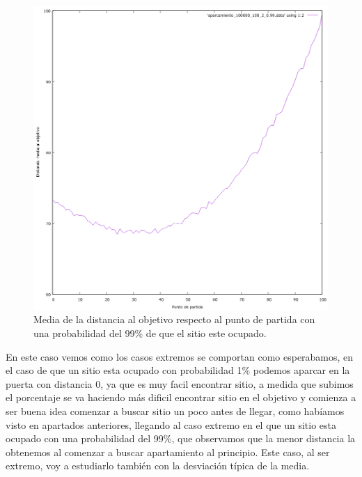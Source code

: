 \documentclass[12pt, spanish]{article}
\begin{document}
\begin{figure}[H]
	\centering
	\includegraphics[scale = 0.6]{aparcamiento_100000_100_2_0-99.png}
	\caption{Media de la distancia al objetivo respecto al punto de partida con una probabilidad del 99\% de que el sitio este ocupado.}
	\label{fig:ej4}
\end{figure}


En este caso vemos como los casos extremos se comportan como esperabamos, en el caso de que un sitio esta ocupado con probabilidad 1\% podemos aparcar en la puerta con distancia 0, ya que es muy facil encontrar sitio, a medida que subimos el porcentaje se va haciendo más dificil encontrar sitio en el objetivo y comienza a ser buena idea comenzar a buscar sitio un poco antes de llegar, como habíamos visto en apartados anteriores, llegando al caso extremo en el que un sitio esta ocupado con una probabilidad del 99\%, que observamos que la menor distancia la obtenemos al comenzar a buscar apartamiento al principio. Este caso, al ser extremo, voy a estudiarlo también con la desviación típica de la media.
\end{document}
